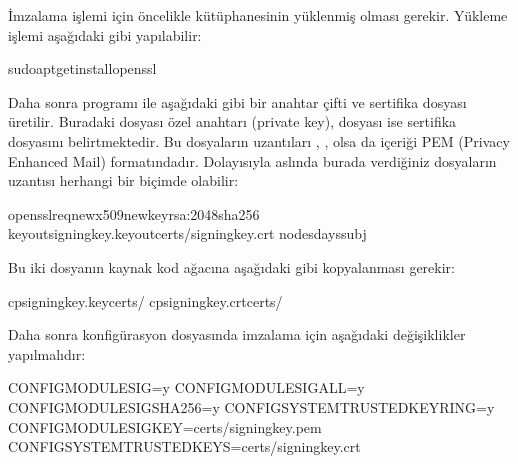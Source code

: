 \documentclass[a4paper,10pt,turkish]{sphinxmanual}
\begin{document}
\sphinxAtStartPar
{} İmzalama işlemi için öncelikle  kütüphanesinin yüklenmiş olması gerekir. Yükleme
işlemi aşağıdaki gibi yapılabilir:

\begin{sphinxVerbatim}[commandchars=\\\{\}]
\PYGZdl{}sudoapt\PYGZhy{}getinstallopenssl
\end{sphinxVerbatim}

\sphinxAtStartPar
Daha sonra  programı ile aşağıdaki gibi bir anahtar çifti ve sertifika dosyası üretilir.
Buradaki  dosyası özel anahtarı (private key),  dosyası ise sertifika dosyasını
belirtmektedir. Bu dosyaların uzantıları , ,  olsa da içeriği PEM (Privacy
Enhanced Mail) formatındadır. Dolayısıyla aslında burada verdiğiniz dosyaların uzantısı herhangi bir
biçimde olabilir:

\begin{sphinxVerbatim}[commandchars=\\\{\}]
\PYGZdl{}opensslreq\PYGZhy{}new\PYGZhy{}x509\PYGZhy{}newkeyrsa:2048\PYGZhy{}sha256
\PYGZhy{}keyoutsigning\PYGZus{}key.key\PYGZhy{}outcerts/signing\PYGZus{}key.crt
\PYGZhy{}nodes\PYGZhy{}days\PYGZhy{}subj
\end{sphinxVerbatim}

\sphinxAtStartPar
Bu iki dosyanın kaynak kod ağacına aşağıdaki gibi kopyalanması gerekir:

\begin{sphinxVerbatim}[commandchars=\\\{\}]
\PYGZdl{}cpsigning\PYGZus{}key.keycerts/
\PYGZdl{}cpsigning\PYGZus{}key.crtcerts/
\end{sphinxVerbatim}

\sphinxAtStartPar
Daha sonra konfigürasyon dosyasında imzalama için aşağıdaki değişiklikler yapılmalıdır:

\begin{sphinxVerbatim}[commandchars=\\\{\}]
CONFIG\PYGZus{}MODULE\PYGZus{}SIG=y
CONFIG\PYGZus{}MODULE\PYGZus{}SIG\PYGZus{}ALL=y
CONFIG\PYGZus{}MODULE\PYGZus{}SIG\PYGZus{}SHA256=y
CONFIG\PYGZus{}SYSTEM\PYGZus{}TRUSTED\PYGZus{}KEYRING=y
CONFIG\PYGZus{}MODULE\PYGZus{}SIG\PYGZus{}KEY=\PYGZdq{}certs/signing\PYGZus{}key.pem\PYGZdq{}
CONFIG\PYGZus{}SYSTEM\PYGZus{}TRUSTED\PYGZus{}KEYS=\PYGZdq{}certs/signing\PYGZus{}key.crt\PYGZdq{}
\end{sphinxVerbatim}
\end{document}
